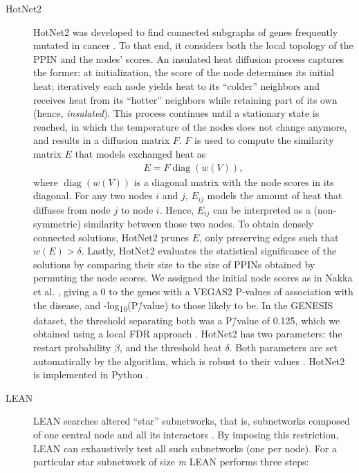 \documentclass[10pt,letterpaper]{article}
\begin{document}
\begin{description}
\item[{HotNet2}] HotNet2 was developed to find connected subgraphs of genes frequently mutated in cancer \cite{leiserson_pan-cancer_2015}. To that end, it considers both the local topology of the PPIN and the nodes' scores. An insulated heat diffusion process captures the former: at initialization, the score of the node determines its initial heat; iteratively each node yields heat to its ``colder'' neighbors and receives heat from its ``hotter'' neighbors while retaining part of its own (hence, \emph{insulated}). This process continues until a stationary state is reached, in which the temperature of the nodes does not change anymore, and results in a diffusion matrix $F$. $F$ is used to compute the similarity matrix $E$ that models exchanged heat as
\begin{eqnarray} 
E = F \operatorname{diag}(w(V)), 
\end{eqnarray}
where $\operatorname{diag}(w(V))$ is a diagonal matrix with the node scores in its diagonal. For any two nodes $i$ and $j$, $E_{ij}$ models the amount of heat that diffuses from node $j$ to node $i$. Hence, $E_{ij}$ can be interpreted as a (non-symmetric) similarity between those two nodes. To obtain densely connected solutions, HotNet2 prunes $E$, only preserving edges such that $w(E) > \delta$. Lastly, HotNet2 evaluates the statistical significance of the solutions by comparing their size to the size of PPINs obtained by permuting the node scores. We assigned the initial node scores as in Nakka et al. \cite{nakka_gene_2016}, giving a 0 to the genes with a VEGAS2 P-values of association with the disease, and -log\textsubscript{10}(P\=/value) to those likely to be. In the GENESIS dataset, the threshold separating both was a P\=/value of 0.125, which we obtained using a local FDR approach \cite{scheid_twilight;_2005}. HotNet2 has two parameters: the restart probability \(\beta\), and the threshold heat \(\delta\). Both parameters are set automatically by the algorithm, which is robust to their values \cite{leiserson_pan-cancer_2015}. HotNet2 is implemented in Python \cite{hotnet2}.

\item[{LEAN}] LEAN searches altered ``star'' subnetworks, that is, subnetworks composed of one central node and all its interactors \cite{gwinner_network-based_2016}. By imposing this restriction, LEAN can exhaustively test all such subnetworks (one per node). For a particular star subnetwork of size \emph{m} LEAN performs three steps:


\end{description}
\end{document}

